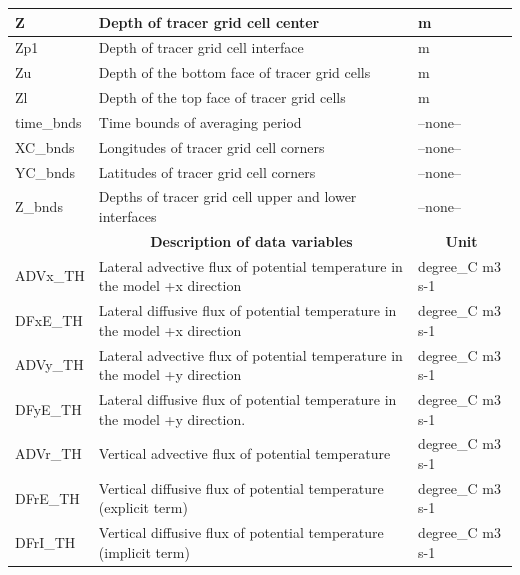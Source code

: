 \begin{longtable}{|m{}|m{}|m{}|}
Z &Depth of tracer grid cell center &m  \\ \hline
Zp1 &Depth of tracer grid cell interface &m  \\ \hline
Zu &Depth of the bottom face of tracer grid cells &m  \\ \hline
Zl &Depth of the top face of tracer grid cells &m  \\ \hline
time\_bnds &Time bounds of averaging period &--none--  \\ \hline
XC\_bnds &Longitudes of tracer grid cell corners &--none--  \\ \hline
YC\_bnds &Latitudes of tracer grid cell corners &--none--  \\ \hline
Z\_bnds &Depths of tracer grid cell upper and lower interfaces &--none--  \\ \hline
\rowcolor{lightgray} \multicolumn{1}{|c|}{\textbf{Variables}} & \multicolumn{1}{|c|}{\textbf{Description of data variables}} &  \multicolumn{1}{|c|}{\textbf{Unit}}\\ \hline
ADVx\_TH &Lateral advective flux of potential temperature in the model +x direction &degree\_C m3 s-1  \\ \hline
DFxE\_TH &Lateral diffusive flux of potential temperature in the model +x direction &degree\_C m3 s-1  \\ \hline
ADVy\_TH &Lateral advective flux of potential temperature in the model +y direction &degree\_C m3 s-1  \\ \hline
DFyE\_TH &Lateral diffusive flux of potential temperature in the model +y direction. &degree\_C m3 s-1  \\ \hline
ADVr\_TH &Vertical advective flux of potential temperature &degree\_C m3 s-1  \\ \hline
DFrE\_TH &Vertical diffusive flux of potential temperature (explicit term) &degree\_C m3 s-1  \\ \hline
DFrI\_TH &Vertical diffusive flux of potential temperature (implicit term) &degree\_C m3 s-1  \\ \hline
\end{longtable}

\newp
\pagebreak
